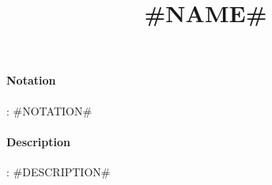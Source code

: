 \documentclass[10pt,a4paper,oneside]{scrartcl}
\author{}
\title{#NAME#}
\date{}
\begin{document}
\maketitle
\paragraph{Notation}: #NOTATION#
\paragraph{Description}: #DESCRIPTION#

\printbibliography
\end{document}
